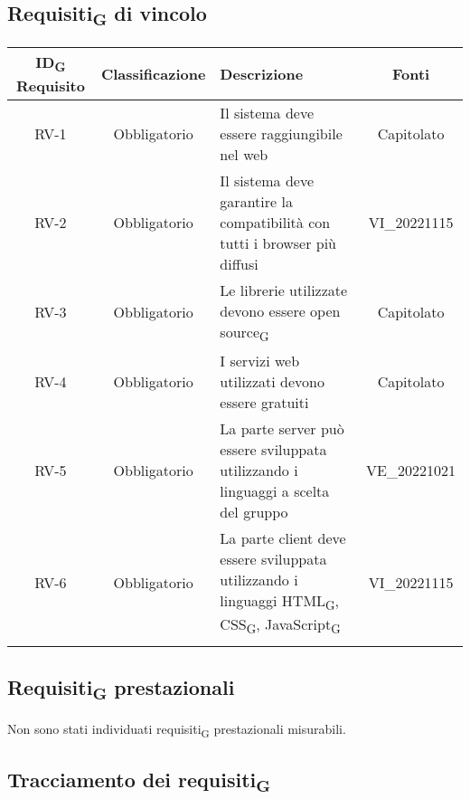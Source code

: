 \subsection{Requisiti\textsubscript{G} di vincolo}
\renewcommand\tabularxcolumn[1]{>{\Centering}m{#1}}
\begin{tabularx}{\textwidth}{| c | c | X | c |} 
 \hline
 \textbf{ID\textsubscript{G} Requisito} & \textbf{Classificazione} & \textbf{Descrizione} & \textbf{Fonti} \\
 \hline
 RV-1 & Obbligatorio &  Il sistema deve essere raggiungibile nel web & Capitolato\\
 \hline
  RV-2 & Obbligatorio & Il sistema deve garantire la compatibilità con tutti i browser più diffusi & VI\_20221115\\
 \hline
 RV-3 & Obbligatorio &  Le librerie utilizzate devono essere open source\textsubscript{G} & Capitolato\\
 \hline
 RV-4 & Obbligatorio & I servizi web utilizzati devono essere gratuiti &  Capitolato\\
 \hline
 RV-5 & Obbligatorio & La parte server può essere sviluppata utilizzando i linguaggi a scelta del gruppo & VE\_20221021\\
 \hline
 RV-6 & Obbligatorio & La parte client deve essere sviluppata utilizzando i linguaggi HTML\textsubscript{G}, CSS\textsubscript{G}, JavaScript\textsubscript{G} & VI\_20221115\\
 \hline
 \caption{Requisiti\textsubscript{G} di vincolo}
\end{tabularx}

\subsection{Requisiti\textsubscript{G} prestazionali}
Non sono stati individuati requisiti\textsubscript{G} prestazionali misurabili.

\subsection{Tracciamento dei requisiti\textsubscript{G}}

